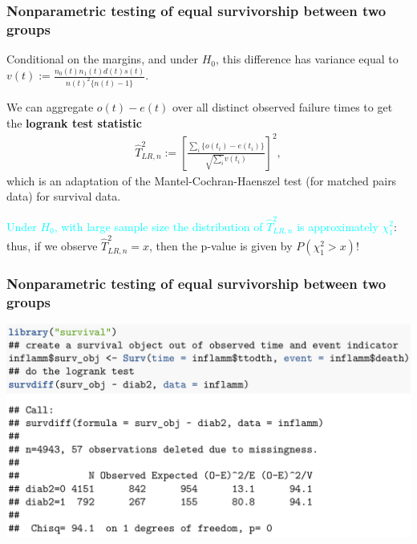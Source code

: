\documentclass[12pt, 
hyperref={colorlinks=true, linkcolor=blue, urlcolor=cyan},dvipsnames]{beamer}
\begin{document}
\begin{frame}
\frametitle{Nonparametric testing of equal survivorship between two groups}
Conditional on the margins, and under $H_0$, this difference has variance equal to $v(t) := \frac{n_0(t)n_1(t)d(t)s(t)}{n(t)^2\{n(t) - 1\}}$.

We can aggregate $o(t) - e(t)$ over \textcolor{BurntOrange}{all distinct observed failure times} to get the \textbf{logrank test statistic}
\begin{align*}
\widehat{T}^2_{LR, n} := \left[\frac{\sum_i \{o(t_i) - e(t_i)\}}{\sqrt{\sum_i}v(t_i)} \right]^2,
\end{align*}
which is an adaptation of the Mantel-Cochran-Haenszel test (for matched pairs data) for survival data.

\textcolor{cyan}{Under $H_0$, with large sample size the distribution of $\widehat{T}^2_{LR, n}$ is approximately $\chi^2_1$}: thus, if we observe $\widehat{T}^2_{LR, n} = x$, then the p-value is given by $P(\chi^2_1 > x)$!
\end{frame}

\begin{frame}
\frametitle{Nonparametric testing of equal survivorship between two groups}

\centering
\includegraphics[width=1\textwidth]{figs/inflamm_logrank.png}
\end{frame}
\end{document}
